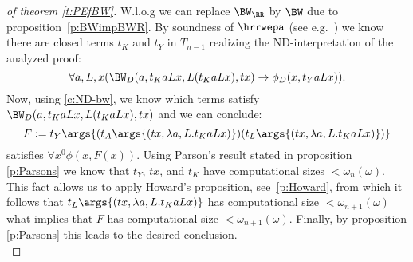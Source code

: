 \begin{proof}[ of theorem \ref{t:PEfBW}]
W.l.o.g we can replace $\BW_\RR$ by $\BW$ due to proposition~\ref{p:BWimpBWR}.
By soundness of $\hrrwepa$ (see e.g.~\cite{Kohlenbach08}) we know there
are closed terms $t_K$ and $t_Y$ in $T_{n-1}$ realizing the ND-interpretation 
of the analyzed proof:
\[
\forall a,L,x (\BW_D(a,t_KaLx,L(t_KaLx),tx)\rightarrow\phi_D(x,t_YaLx))
\text{.}
\]
Now, using \ref{c:ND-bw}, we know which terms satisfy $\BW_D(a,t_KaLx,L(t_KaLx),tx)$
and we can conclude:
\[
F:= t_Y\args{
     (t_A\args{(
            tx,
            \lambda a,L.t_KaLx)
           })
     (t_L\args{(
            tx,
            \lambda a,L.t_KaLx)
           })
    }
\]
satisfies $\forall x^0 \phi(x,F(x))$. Using Parson's result
stated in proposition \ref{p:Parsons} we know that
$t_Y$, $tx$, and $t_K$ have computational sizes $<\omega_{n}(\omega)$.
This fact allows us to apply Howard's proposition, see~\ref{p:Howard},
from which it follows that $t_L\args{(tx,\lambda a,L.t_KaLx)}$ has 
computational size $<\omega_{n+1}(\omega)$ what implies that $F$
has computational size $<\omega_{n+1}(\omega)$. Finally,
by proposition \ref{p:Parsons} this leads to the desired conclusion.\\
\end{proof}




